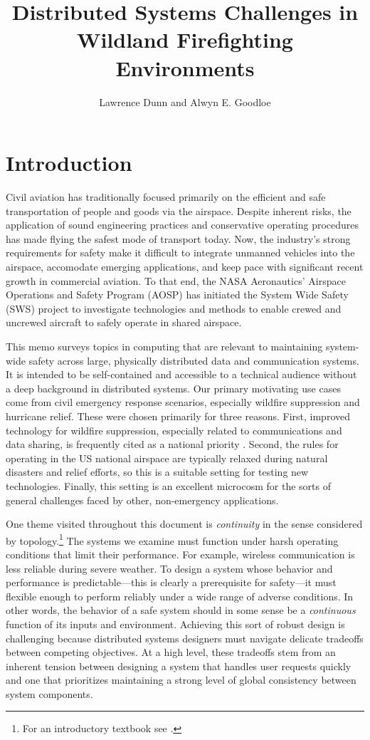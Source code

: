 \documentclass[]             %
{NASA}                       %
\title{Distributed Systems Challenges in Wildland Firefighting Environments}
\author{Lawrence Dunn and Alwyn E. Goodloe}
\theoremstyle{definition}
\begin{document}
\newpage
\setcounter{tocdepth}{2}
\tableofcontents
\newpage

\section{Introduction}
\label{sec:introduction}
Civil aviation has traditionally focused primarily on the efficient
and safe transportation of people and goods via the airspace. Despite
inherent risks, the application of sound engineering practices and
conservative operating procedures has made flying the safest mode of
transport today. Now, the industry's strong requirements for safety
make it difficult to integrate unmanned vehicles into the airspace,
accomodate emerging applications, and keep pace with significant
recent growth in commercial aviation. To that end, the NASA
Aeronautics' Airspace Operations and Safety Program (AOSP) has
initiated the System Wide Safety (SWS) project to investigate
technologies and methods to enable crewed and uncrewed aircraft to
safely operate in shared airspace.

This memo surveys topics in computing that are relevant to maintaining
system-wide safety across large, physically distributed data and
communication systems. It is intended to be self-contained and
accessible to a technical audience without a deep background in
distributed systems. Our primary motivating use cases come from civil
emergency response scenarios, especially wildfire suppression and
hurricane relief. These were chosen primarily for three
reasons. First, improved technology for wildfire suppression,
especially related to communications and data sharing, is frequently
cited as a national priority \cite{pcast2023}.  Second, the rules for
operating in the US national airspace are typically relaxed during
natural disasters and relief efforts, so this is a suitable setting
for testing new technologies. Finally, this setting is an excellent
microcosm for the sorts of general challenges faced by other,
non-emergency applications.

One theme visited throughout this document is \emph{continuity} in the sense
considered by topology.\footnote{For an introductory textbook see
  \cite{mendelson2012introduction}.}  The systems we examine must
function under harsh operating conditions that limit their
performance. For example, wireless communication is less reliable
during severe weather. To design a system whose behavior and
performance is predictable---this is clearly a prerequisite for
safety---it must flexible enough to perform reliably under a wide
range of adverse conditions. In other words, the behavior of a safe
system should in some sense be a \emph{continuous} function of its
inputs and environment. Achieving this sort of robust design is
challenging because distributed systems designers must navigate
delicate tradeoffs between competing objectives. At a high level,
these tradeoffs stem from an inherent tension between designing a
system that handles user requests quickly and one that prioritizes
maintaining a strong level of global consistency between system
components.
\end{document}
